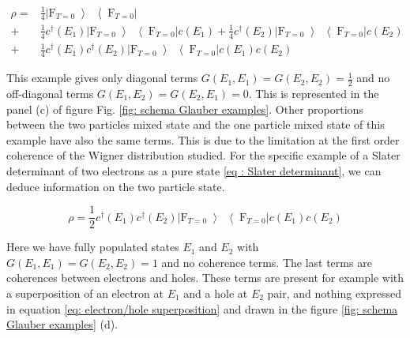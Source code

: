\begin{align}
\rho =  &\frac{1}{4}\left|\mathrm{F}_{T=0}\left>\right<\mathrm{F}_{T=0}\right|\\
 + &\frac{1}{4}c^{\dagger}\left(E_{1}\right)\left|\mathrm{F}_{T=0}\left>\right<\mathrm{F}_{T=0}\right|c\left(E_{1}\right) +\frac{1}{4} c^{\dagger}\left(E_{2}\right)\left|\mathrm{F}_{T=0}\left>\right<\mathrm{F}_{T=0}\right|c\left(E_{2}\right) \\
 + &\frac{1}{4}c^{\dagger}\left(E_{1}\right)c^{\dagger}\left(E_{2}\right)\left|\mathrm{F}_{T=0}\left>\right<\mathrm{F}_{T=0}\right|c\left(E_{1}\right)c\left(E_{2}\right) \label{eq: mixed two particle states}
\end{align}

This example gives only diagonal terms $G(E_1,E_1) = G(E_2,E_2) = \frac{1}{2}$ and no off-diagonal terms $G(E_1,E_2) = G(E_2,E_1) = 0$.
This is represented in the panel (c) of figure Fig. \ref{fig: schema Glauber examples}.
Other proportions between the two particles mixed state and the one particle mixed state of this example have also the same terms.
This is due to the limitation at the first order coherence of the Wigner distribution studied.
For the specific example of a Slater determinant of two electrons as a pure state \eqref{eq : Slater determinant}, we can deduce information on the two particle state. 

\begin{equation}
\rho = \frac{1}{2}c^{\dagger}\left(E_{1}\right)c^{\dagger}\left(E_{2}\right)\left|\mathrm{F}_{T=0}\left>\right<\mathrm{F}_{T=0}\right|c\left(E_{1}\right)c\left(E_{2}\right) \label{eq : Slater determinant}
\end{equation}

Here we have fully populated states $E_{1}$ and $E_{2}$ with $G(E_1,E_1) = G(E_2,E_2) = 1$ and no coherence terms.
The last terms are coherences between electrons and holes.
These terms are present for example with a superposition of an electron at $E_{1}$ and a hole at $E_{2}$ pair, and nothing expressed in equation \eqref{eq: electron/hole superposition} and drawn in the figure \ref{fig: schema Glauber examples} (d).

